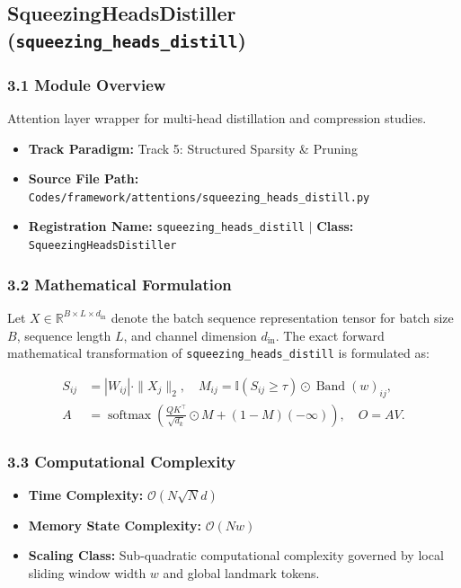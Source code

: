 \subsection{SqueezingHeadsDistiller (\texttt{squeezing\_heads\_distill})}
\label{sec:app_module_squeezing_heads_distill}

\subsubsection*{3.1 Module Overview}
Attention layer wrapper for multi-head distillation and compression studies.
\begin{itemize}
    \item \textbf{Track Paradigm:} Track 5: Structured Sparsity \& Pruning
    \item \textbf{Source File Path:} \texttt{Codes/framework/attentions/squeezing\_heads\_distill.py}
    \item \textbf{Registration Name:} \texttt{squeezing\_heads\_distill} $\mid$ \textbf{Class:} \texttt{SqueezingHeadsDistiller}
\end{itemize}

\subsubsection*{3.2 Mathematical Formulation}
Let $X \in \mathbb{R}^{B \times L \times d_{\text{in}}}$ denote the batch sequence representation tensor for batch size $B$, sequence length $L$, and channel dimension $d_{\text{in}}$. The exact forward mathematical transformation of \texttt{squeezing\_heads\_distill} is formulated as:

\begin{align}
S_{ij} &= |W_{ij}| \cdot \|X_j\|_2, \quad M_{ij} = \mathbb{I}(S_{ij} \ge \tau) \odot \operatorname{Band}(w)_{ij}, \\
A &= \operatorname{softmax}\left(\frac{Q K^\top}{\sqrt{d_k}} \odot M + (1 - M)(-\infty)\right), \quad O = A V.
\end{align}


\subsubsection*{3.3 Computational Complexity}
\begin{itemize}
    \item \textbf{Time Complexity:} $\mathcal{O}(N \sqrt{N} d)$
    \item \textbf{Memory State Complexity:} $\mathcal{O}(N w)$
    \item \textbf{Scaling Class:} Sub-quadratic computational complexity governed by local sliding window width $w$ and global landmark tokens.
\end{itemize}

